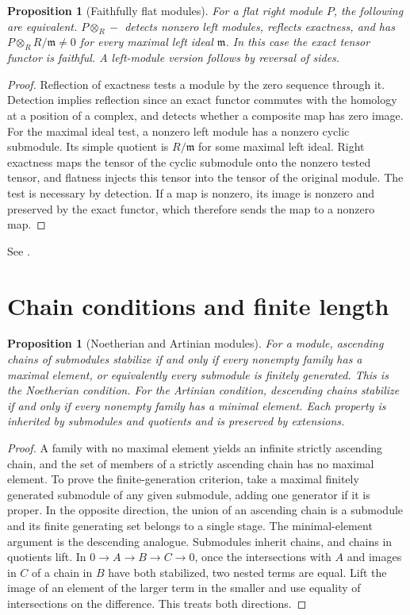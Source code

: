 \documentclass[11pt,oneside,openany]{book}
\newtheorem{proposition}[theorem]{Proposition}
\theoremstyle{definition}
\theoremstyle{remark}
\begin{document}
\begin{proposition}[Faithfully flat modules]\label{p103:ALG-03-C02-S04}
For a flat right module \(P\), the following are equivalent.
\(P\otimes_R-\) detects nonzero left modules, reflects exactness,
and has \(P\otimes_R R/\mathfrak m\ne0\) for every maximal left
ideal \(\mathfrak m\). In this case the exact tensor functor is
faithful. A left-module version follows by reversal of sides.
\end{proposition}
\begin{proof}
Reflection of exactness tests a module by the zero sequence
through it. Detection implies reflection since an exact functor
commutes with the homology at a position of a complex, and detects
whether a composite map has zero image. For the maximal ideal test,
a nonzero left module has a nonzero cyclic submodule. Its simple
quotient is \(R/\mathfrak m\) for some maximal left ideal.
Right exactness maps the tensor of the cyclic submodule onto
the nonzero tested tensor, and flatness injects this tensor into
the tensor of the original module. The test is necessary by
detection. If a map is nonzero, its image is nonzero and preserved
by the exact functor, which therefore sends the map to a nonzero map.
\end{proof}
See \cite[Section 4I]{lam}.

\section{Chain conditions and finite length}

\begin{proposition}[Noetherian and Artinian modules]
\label{p103:ALG-03-C03-R01}
For a module, ascending chains of submodules stabilize if and only
if every nonempty family has a maximal element, or equivalently
every submodule is finitely generated. This is the Noetherian
condition. For the Artinian condition, descending chains stabilize
if and only if every nonempty family has a minimal element.
Each property is inherited by submodules and quotients and is
preserved by extensions.
\end{proposition}
\begin{proof}
A family with no maximal element yields an infinite strictly
ascending chain, and the set of members of a strictly ascending
chain has no maximal element. To prove the finite-generation
criterion, take a maximal finitely generated submodule of any
given submodule, adding one generator if it is proper. In the
opposite direction, the union of an ascending chain is a submodule
and its finite generating set belongs to a single stage.
The minimal-element argument is the descending analogue.
Submodules inherit chains, and chains in quotients lift. In
\(0\to A\to B\to C\to0\), once the intersections with \(A\)
and images in \(C\) of a chain in \(B\) have both stabilized,
two nested terms are equal. Lift the image of an element of
the larger term in the smaller and use equality of intersections
on the difference. This treats both directions.
\end{proof}
\end{document}
